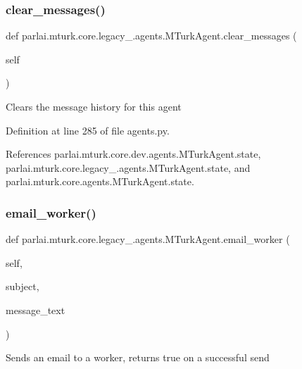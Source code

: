 \subsubsection{\texorpdfstring{clear\+\_\+messages()}{clear\_messages()}}
{\footnotesize\ttfamily def parlai.\+mturk.\+core.\+legacy\+\_.\+agents.\+M\+Turk\+Agent.\+clear\+\_\+messages (\begin{DoxyParamCaption}\item[{}]{self }\end{DoxyParamCaption})}

\begin{DoxyVerb}Clears the message history for this agent\end{DoxyVerb}
 

Definition at line 285 of file agents.\+py.



References parlai.\+mturk.\+core.\+dev.\+agents.\+M\+Turk\+Agent.\+state, parlai.\+mturk.\+core.\+legacy\+\_.\+agents.\+M\+Turk\+Agent.\+state, and parlai.\+mturk.\+core.\+agents.\+M\+Turk\+Agent.\+state.

\mbox{\label{classparlai_1_1mturk_1_1core_1_1legacy__2018_1_1agents_1_1MTurkAgent_ae0ae59f99630aeebb0ef2123711948b3}} 
\subsubsection{\texorpdfstring{email\+\_\+worker()}{email\_worker()}}
{\footnotesize\ttfamily def parlai.\+mturk.\+core.\+legacy\+\_.\+agents.\+M\+Turk\+Agent.\+email\+\_\+worker (\begin{DoxyParamCaption}\item[{}]{self,  }\item[{}]{subject,  }\item[{}]{message\+\_\+text }\end{DoxyParamCaption})}

\begin{DoxyVerb}Sends an email to a worker, returns true on a successful send\end{DoxyVerb}
 

